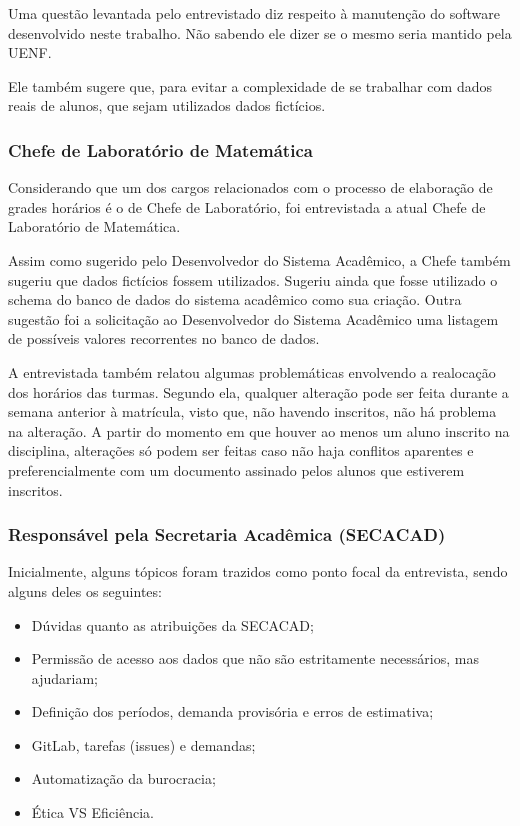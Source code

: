         Uma questão levantada pelo entrevistado diz respeito à manutenção do software desenvolvido neste trabalho. Não sabendo ele dizer se o mesmo seria mantido pela UENF.

        Ele também sugere que, para evitar a complexidade de se trabalhar com dados reais de alunos, que sejam utilizados dados fictícios.

    \subsubsection{Chefe de Laboratório de Matemática} %

        Considerando que um dos cargos relacionados com o processo de elaboração de grades horários é o de Chefe de Laboratório, foi entrevistada a atual Chefe de Laboratório de Matemática.

        Assim como sugerido pelo Desenvolvedor do Sistema Acadêmico, a Chefe também sugeriu que dados fictícios fossem utilizados. Sugeriu ainda que fosse utilizado o schema do banco de dados do sistema acadêmico como sua criação. Outra sugestão foi a solicitação ao Desenvolvedor do Sistema Acadêmico uma listagem de possíveis valores recorrentes no banco de dados.

        A entrevistada também relatou algumas problemáticas envolvendo a realocação dos horários das turmas. Segundo ela, qualquer alteração pode ser feita durante a semana anterior à matrícula, visto que, não havendo inscritos, não há problema na alteração. A partir do momento em que houver ao menos um aluno inscrito na disciplina, alterações só podem ser feitas caso não haja conflitos aparentes e preferencialmente com um documento assinado pelos alunos que estiverem inscritos.

    \subsubsection{Responsável pela Secretaria Acadêmica (SECACAD)} %

        Inicialmente, alguns tópicos foram trazidos como ponto focal da entrevista, sendo alguns deles os seguintes:

        \begin{itemize}
            \item Dúvidas quanto as atribuições da SECACAD;
            \item Permissão de acesso aos dados que não são estritamente necessários, mas ajudariam;
            \item Definição dos períodos, demanda provisória e erros de estimativa;
            \item GitLab, tarefas (issues) e demandas;
            \item Automatização da burocracia;
            \item Ética VS Eficiência.
        \end{itemize}


